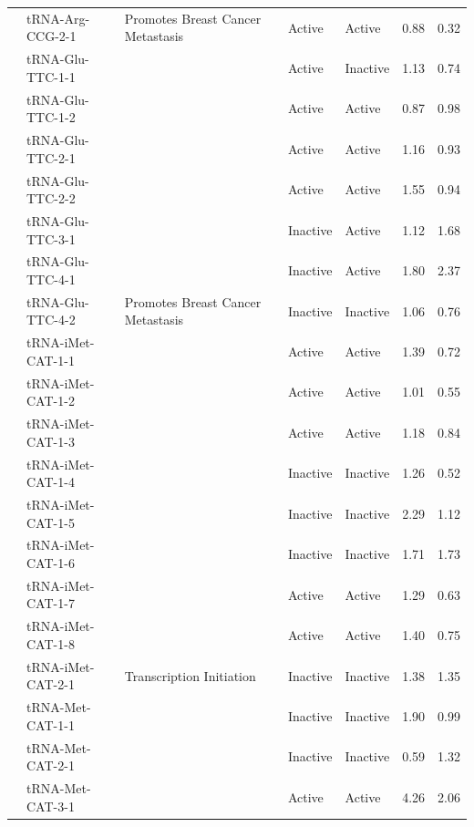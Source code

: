 \documentclass[
  12pt,
]{article}
\begin{document}
\begin{longtable}[t]{lllllrr}
\nopagebreak
\multirow[t]{-4}{*}{\raggedright\arraybackslash Arg-CCG} & tRNA-Arg-CCG-2-1 & \multirow[t]{-4}{*}{\raggedright\arraybackslash Promotes Breast Cancer Metastasis} & Active & Active & 0.88 & 0.32\\
\cmidrule{1-7}\pagebreak[0]
 & tRNA-Glu-TTC-1-1 &  & Active & Inactive & 1.13 & 0.74\\
\nopagebreak
 & tRNA-Glu-TTC-1-2 &  & Active & Active & 0.87 & 0.98\\
\nopagebreak
 & tRNA-Glu-TTC-2-1 &  & Active & Active & 1.16 & 0.93\\
\nopagebreak
 & tRNA-Glu-TTC-2-2 &  & Active & Active & 1.55 & 0.94\\
\nopagebreak
 & tRNA-Glu-TTC-3-1 &  & Inactive & Active & 1.12 & 1.68\\
\nopagebreak
 & tRNA-Glu-TTC-4-1 &  & Inactive & Active & 1.80 & 2.37\\
\nopagebreak
\multirow[t]{-7}{*}{\raggedright\arraybackslash Glu-TTC} & tRNA-Glu-TTC-4-2 & \multirow[t]{-7}{*}{\raggedright\arraybackslash Promotes Breast Cancer Metastasis} & Inactive & Inactive & 1.06 & 0.76\\
\cmidrule{1-7}\pagebreak[0]
 & tRNA-iMet-CAT-1-1 &  & Active & Active & 1.39 & 0.72\\
\nopagebreak
 & tRNA-iMet-CAT-1-2 &  & Active & Active & 1.01 & 0.55\\
\nopagebreak
 & tRNA-iMet-CAT-1-3 &  & Active & Active & 1.18 & 0.84\\
\nopagebreak
 & tRNA-iMet-CAT-1-4 &  & Inactive & Inactive & 1.26 & 0.52\\
\nopagebreak
 & tRNA-iMet-CAT-1-5 &  & Inactive & Inactive & 2.29 & 1.12\\
\nopagebreak
 & tRNA-iMet-CAT-1-6 &  & Inactive & Inactive & 1.71 & 1.73\\
\nopagebreak
 & tRNA-iMet-CAT-1-7 &  & Active & Active & 1.29 & 0.63\\
\nopagebreak
 & tRNA-iMet-CAT-1-8 &  & Active & Active & 1.40 & 0.75\\
\nopagebreak
\multirow[t]{-9}{*}{\raggedright\arraybackslash iMET} & tRNA-iMet-CAT-2-1 & \multirow[t]{-9}{*}{\raggedright\arraybackslash Transcription Initiation} & Inactive & Inactive & 1.38 & 1.35\\
\cmidrule{1-7}\pagebreak[0]
 & tRNA-Met-CAT-1-1 &  & Inactive & Inactive & 1.90 & 0.99\\
\nopagebreak
 & tRNA-Met-CAT-2-1 &  & Inactive & Inactive & 0.59 & 1.32\\
\nopagebreak
 & tRNA-Met-CAT-3-1 &  & Active & Active & 4.26 & 2.06\\

\end{longtable}
\end{document}
